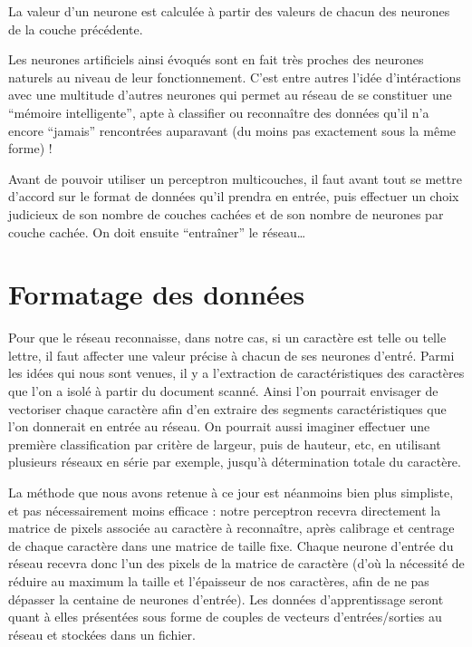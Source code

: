 \documentclass[a4paper,12pt]{report}
\begin{document}
La valeur d'un neurone est calcul\'ee \`a partir des valeurs de chacun
des neurones de la couche pr\'ec\'edente.

Les neurones artificiels ainsi \'evoqu\'es sont en fait tr\`es proches
des neurones naturels au niveau de leur fonctionnement. C'est entre
autres l'id\'ee d'int\'eractions avec une multitude d'autres neurones
qui permet au r\'eseau de se constituer une ``m\'emoire intelligente'',
apte \`a classifier ou reconna\^itre des donn\'ees qu'il n'a encore
``jamais'' rencontr\'ees auparavant (du moins pas exactement sous la
même forme) !

Avant de pouvoir utiliser un perceptron multicouches, il faut avant tout se mettre d'accord sur le
format de donn\'ees qu'il prendra en entr\'ee, puis effectuer un choix
judicieux de son nombre de couches cach\'ees et de son nombre de neurones
par couche cach\'ee. On doit ensuite ``entra\^iner'' le r\'eseau\ldots


\section{Formatage des donn\'ees} %
\label{subsec:formatage_des_donnees}

Pour que le r\'eseau reconnaisse, dans notre cas, si un caract\`ere est
telle ou telle lettre, il faut affecter une valeur pr\'ecise à chacun de
ses neurones d'entr\'e.
Parmi les id\'ees qui nous sont venues, il y a l'extraction de
caract\'eristiques des caract\`eres que l'on a isol\'e \`a partir du document
scann\'e. Ainsi l'on pourrait envisager de vectoriser chaque caract\`ere
afin d'en extraire des segments caract\'eristiques que l'on donnerait en
entr\'ee au r\'eseau. On pourrait aussi imaginer effectuer une premi\`ere
classification par crit\`ere de largeur, puis de hauteur, etc, en utilisant
plusieurs r\'eseaux en s\'erie par exemple, jusqu'\`a d\'etermination totale du
caract\`ere.

La m\'ethode que nous avons retenue \`a ce jour est n\'eanmoins bien
plus simpliste, et pas n\'ecessairement moins efficace : notre
perceptron recevra directement la matrice de pixels associ\'ee au
caract\`ere \`a reconna\^itre, apr\`es calibrage et centrage de chaque
caract\`ere dans une matrice de taille fixe.
Chaque neurone d'entr\'ee du r\'eseau recevra donc l'un des pixels de la
matrice de caract\`ere (d'o\`u la n\'ecessit\'e de r\'eduire au maximum
la taille et l'\'epaisseur de nos caract\`eres, afin de ne pas
d\'epasser la centaine de neurones d'entr\'ee).
Les donn\'ees d'apprentissage seront quant \`a elles pr\'esent\'ees sous
forme de couples de vecteurs d'entr\'ees/sorties au r\'eseau et
stock\'ees dans un fichier.
\end{document}

